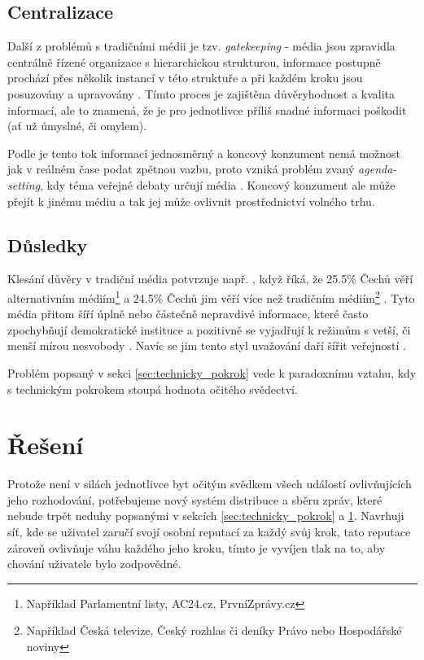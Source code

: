 \documentclass{report}
\begin{document}
\section{Centralizace}
\label{sec:centralizace}
Další z problémů s tradičními médii je tzv. \textit{gatekeeping} - média jsou zpravidla centrálně řízené organizace s hierarchickou strukturou, informace postupně prochází přes několik instancí v této struktuře a při každém kroku jsou posuzovány a upravovány \citep{mazzara13}. Tímto proces je zajištěna důvěryhodnost a kvalita informací, ale to znamená, že je pro jednotlivce příliš snadné informaci poškodit (ať už úmyslné, či omylem).

Podle \citeauthor{mazzara13} je tento tok informací jednosměrný a koncový konzument nemá možnost jak v reálném čase podat zpětnou vazbu, proto vzniká problém zvaný \textit{agenda-setting}, kdy téma veřejné debaty určují média \citep{mazzara13}. Koncový konzument ale může přejít k jinému médiu a tak jej může ovlivnit prostřednictví volného trhu.

\section{Důsledky}
\label{sec:dusledky}
Klesání důvěry v tradiční média potvrzuje např. \citeauthor{janda16b}, když říká, že 25.5\% Čechů věří alternativním médiím\footnote{Například Parlamentní listy, AC24.cz, PrvníZprávy.cz} a 24.5\% Čechů jim věří více než tradičním médiím\footnote{Například Česká televize, Český rozhlas či deníky Právo nebo Hospodářské noviny} \citep{janda16b}. Tyto média přitom šíří úplně nebo částečně nepravdivé informace, které často zpochybňují demokratické instituce a pozitivně se vyjadřují k režimům s vetší, či menší mírou nesvobody \citep{janda16a}. Navíc se jim tento styl uvažování daří šířit veřejností \citep{janda16b}.

Problém popsaný v sekci \ref{sec:technicky_pokrok} vede k paradoxnímu vztahu, kdy s technickým pokrokem stoupá hodnota očitého svědectví.

\chapter{Řešení}
\label{ch:reseni}

Protože není v silách jednotlivce byt očitým svědkem všech událostí ovlivňujících jeho rozhodování, potřebujeme nový systém distribuce a sběru zpráv, které nebude trpět neduhy popsanými v sekcích \ref{sec:technicky_pokrok} a \ref{sec:centralizace}. Navrhuji síť, kde se uživatel zaručí svojí osobní reputací za každý svůj krok, tato reputace zároveň ovlivňuje váhu každého jeho kroku, tímto je vyvíjen tlak na to, aby chování uživatele bylo zodpovědné.
\end{document}
